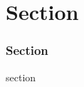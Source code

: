 
\section{Section} %


\iffalse
\begin{frame}
  \Huge{\centerline{Section}}
\end{frame}
\fi

\begin{frame}
  \frametitle{Section}
  \begin{block}{section}
  \end{block}
\end{frame}
